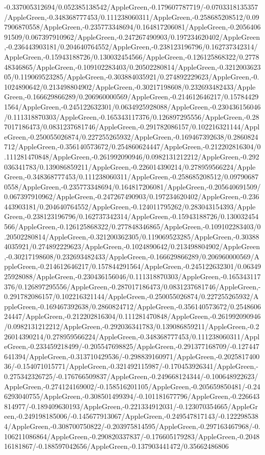 {\begin{tikzternal}
{-0.337005312694/0.052385138542/AppleGreen,-0.179607787719/-0.0703318135357/AppleGreen,-0.348368777453/0.111238060311/AppleGreen,-0.258685208512/0.097906870558/AppleGreen,-0.235773348694/0.164817206081/AppleGreen,-0.205640691509/0.067397910962/AppleGreen,-0.247267490903/0.197234620402/AppleGreen,-0.236443903181/0.204640764552/AppleGreen,-0.238123196796/0.162737342314/AppleGreen,-0.15943188726/0.130032454566/AppleGreen,-0.126125868322/0.277848346865/AppleGreen,-0.109102283403/0.20502280814/AppleGreen,-0.321200362305/0.119069523285/AppleGreen,-0.303884035921/0.274892229623/AppleGreen,-0.1024890642/0.213498804902/AppleGreen,-0.30217198608/0.232693482433/AppleGreen,-0.166629866289/0.206960000569/AppleGreen,-0.214612646217/0.157844291564/AppleGreen,-0.245122632301/0.0634925928088/AppleGreen,-0.230436156046/0.111318870303/AppleGreen,-0.165343117376/0.126897295556/AppleGreen,-0.287017186473/0.0831237681746/AppleGreen,-0.291782086157/0.102216321144/AppleGreen,-0.250055026874/0.227255265932/AppleGreen,-0.169467392638/0.2860824712/AppleGreen,-0.356140573672/0.254860624447/AppleGreen,-0.212202816304/0.111281470848/AppleGreen,-0.261992090946/0.0982131212212/AppleGreen,-0.292036341783/0.139086859211/AppleGreen,-0.226014390214/0.278959566224/AppleGreen,-0.348368777453/0.111238060311/AppleGreen,-0.258685208512/0.097906870558/AppleGreen,-0.235773348694/0.164817206081/AppleGreen,-0.205640691509/0.067397910962/AppleGreen,-0.247267490903/0.197234620402/AppleGreen,-0.236443903181/0.204640764552/AppleGreen,-0.124011795262/0.283043154393/AppleGreen,-0.238123196796/0.162737342314/AppleGreen,-0.15943188726/0.130032454566/AppleGreen,-0.126125868322/0.277848346865/AppleGreen,-0.109102283403/0.20502280814/AppleGreen,-0.321200362305/0.119069523285/AppleGreen,-0.303884035921/0.274892229623/AppleGreen,-0.1024890642/0.213498804902/AppleGreen,-0.30217198608/0.232693482433/AppleGreen,-0.166629866289/0.206960000569/AppleGreen,-0.214612646217/0.157844291564/AppleGreen,-0.245122632301/0.0634925928088/AppleGreen,-0.230436156046/0.111318870303/AppleGreen,-0.165343117376/0.126897295556/AppleGreen,-0.287017186473/0.0831237681746/AppleGreen,-0.291782086157/0.102216321144/AppleGreen,-0.250055026874/0.227255265932/AppleGreen,-0.169467392638/0.2860824712/AppleGreen,-0.356140573672/0.254860624447/AppleGreen,-0.212202816304/0.111281470848/AppleGreen,-0.261992090946/0.0982131212212/AppleGreen,-0.292036341783/0.139086859211/AppleGreen,-0.226014390214/0.278959566224/AppleGreen,-0.348368777453/0.111238060311/AppleGreen,-0.233459218499/-0.205547698825/AppleGreen,-0.291377168709/-0.127447641394/AppleGreen,-0.313710429536/-0.298839160971/AppleGreen,-0.202581740036/-0.154071015771/AppleGreen,-0.321492115987/-0.170453926341/AppleGreen,-0.275342326725/-0.176766509837/AppleGreen,-0.249668124344/-0.100648922623/AppleGreen,-0.274124169002/-0.158516201105/AppleGreen,-0.205659850481/-0.246293040755/AppleGreen,-0.308501499394/-0.101181677796/AppleGreen,-0.226643814977/-0.189409630193/AppleGreen,-0.221334912031/-0.123070354665/AppleGreen,-0.249198185006/-0.145677913067/AppleGreen,-0.249547817143/-0.1222985384/AppleGreen,-0.308700750822/-0.203975814595/AppleGreen,-0.297163467968/-0.106211086864/AppleGreen,-0.290820337837/-0.176605179283/AppleGreen,-0.204816181867/-0.188597042656/AppleGreen,-0.137903441472/0.35662486806}
\end{tikzternal}}
